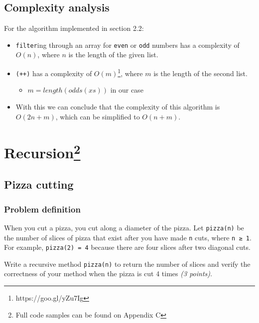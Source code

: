 \documentclass[english,a4paper,]{report}
\providecommand{\tightlist}{%
  \setlength{\itemsep}{0pt}\setlength{\parskip}{0pt}}
\begin{document}
\inputminted[firstline=9,lastline=17]{haskell}{code_samples/Isolate.hs}

\section{Complexity analysis}\label{complexity-analysis}

For the algorithm implemented in section 2.2:

\begin{itemize}
\tightlist
\item
  \texttt{filter}ing through an array for \texttt{even} or \texttt{odd}
  numbers has a complexity of \(O(n)\), where \(n\) is the length of the
  given list.
\item
  \texttt{(++)} has a complexity of \(O(m)\)\footnote{https://goo.gl/yZu7Ig},
  where \(m\) is the length of the second list.

  \begin{itemize}
  \tightlist
  \item
    \(m = length(odds(xs))\) in our case
  \end{itemize}
\item
  With this we can conclude that the complexity of this algorithm is
  \(O(2n+m)\), which can be simplified to \(O(n+m)\).
\end{itemize}

\chapter[Recursion]{\texorpdfstring{Recursion\footnote{Full code samples
  can be found on Appendix C}}{Recursion}}\label{recursion4}

\section{Pizza cutting}\label{pizza-cutting}

\subsection{Problem definition}\label{problem-definition}

When you cut a pizza, you cut along a diameter of the pizza. Let
\texttt{pizza(n)} be the number of slices of pizza that exist after you
have made \texttt{n} cuts, where \texttt{n\ ≥\ 1}. For example,
\texttt{pizza(2)\ =\ 4} because there are four slices after two diagonal
cuts.

Write a recursive method \texttt{pizza(n)} to return the number of
slices and verify the correctness of your method when the pizza is cut 4
times \emph{(3 points)}.
\end{document}
